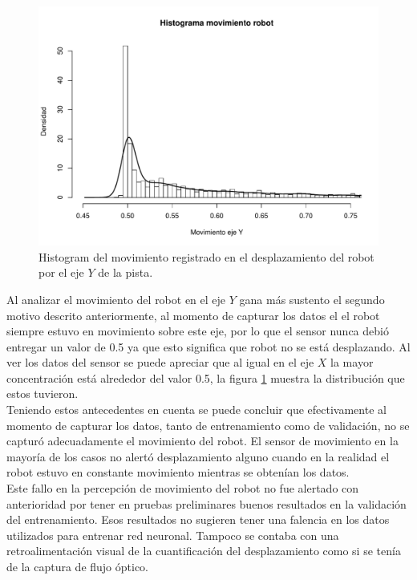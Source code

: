\documentclass{iccmemoria}
\begin{document}
\begin{figure}[H]
  \centering
  \includegraphics[width = 450pt]{images/hist_motion_robot_y.pdf}
  \caption[Histograma movimiento robot en eje $Y$]{Histogram del movimiento registrado en el desplazamiento del robot por el eje $Y$ de la pista.}
  \label{fig:hist motion robot y}
\end{figure}

Al analizar el movimiento del robot en el eje $Y$ gana más sustento el segundo motivo descrito anteriormente, al momento de capturar los datos el el robot siempre estuvo en movimiento sobre este eje, por lo que el sensor nunca debió entregar un valor de 0.5 ya que esto significa que robot no se está desplazando. Al ver los datos del sensor se puede apreciar que al igual en el eje $X$ la mayor concentración está alrededor del valor 0.5, la figura \ref{fig:hist motion robot y} muestra la distribución que estos tuvieron.\\

Teniendo estos antecedentes en cuenta se puede concluir que efectivamente al momento de capturar los datos, tanto de entrenamiento como de validación, no se capturó adecuadamente el movimiento del robot. El sensor de movimiento en la mayoría de los casos no alertó desplazamiento alguno cuando en la realidad el robot estuvo en constante movimiento mientras se obtenían los datos.\\

Este fallo en la percepción de movimiento del robot no fue alertado con anterioridad por tener en pruebas preliminares buenos resultados en la validación del entrenamiento. Esos resultados no sugieren tener una falencia en los datos utilizados para entrenar red neuronal. Tampoco se contaba con una retroalimentación visual de la cuantificación del desplazamiento como si se tenía de la captura de flujo óptico.\\
\end{document}
